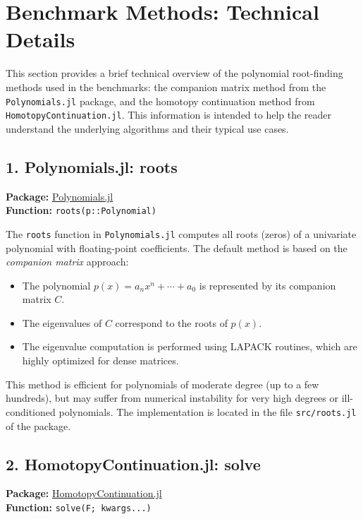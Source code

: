\documentclass{article}
\begin{document}
\section*{Benchmark Methods: Technical Details}

This section provides a brief technical overview of the polynomial root-finding methods used in the benchmarks: the companion matrix method from the \texttt{Polynomials.jl} package, and the homotopy continuation method from \texttt{HomotopyContinuation.jl}. This information is intended to help the reader understand the underlying algorithms and their typical use cases.

\subsection*{1. Polynomials.jl: roots}
\textbf{Package:} \href{https://github.com/JuliaMath/Polynomials.jl}{Polynomials.jl}\\
\textbf{Function:} \texttt{roots(p::Polynomial)}

The \texttt{roots} function in \texttt{Polynomials.jl} computes all roots (zeros) of a univariate polynomial with floating-point coefficients. The default method is based on the \emph{companion matrix} approach:
\begin{itemize}
  \item The polynomial $p(x) = a_n x^n + \cdots + a_0$ is represented by its companion matrix $C$.
  \item The eigenvalues of $C$ correspond to the roots of $p(x)$.
  \item The eigenvalue computation is performed using LAPACK routines, which are highly optimized for dense matrices.
\end{itemize}
This method is efficient for polynomials of moderate degree (up to a few hundreds), but may suffer from numerical instability for very high degrees or ill-conditioned polynomials. The implementation is located in the file \texttt{src/roots.jl} of the package.

\subsection*{2. HomotopyContinuation.jl: solve}
\textbf{Package:} \href{https://github.com/JuliaHomotopyContinuation/HomotopyContinuation.jl}{HomotopyContinuation.jl}\\
\textbf{Function:} \texttt{solve(F; kwargs...)}
\end{document}
